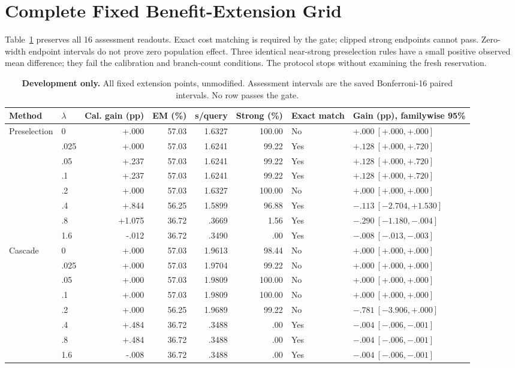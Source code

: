 \documentclass[11pt]{article}
\begin{document}
\section{Complete Fixed Benefit-Extension Grid}
\label{app:benefit}
Table~\ref{tab:benefitall} preserves all 16 assessment readouts. Exact cost matching is required by the gate; clipped strong endpoints cannot pass. Zero-width endpoint intervals do not prove zero population effect. Three identical near-strong preselection rules have a small positive observed mean difference; they fail the calibration and branch-count conditions. The protocol stops without examining the fresh reservation.

\begin{table}[t]
\centering\small
\begin{tabular}{llrrrrll}
\toprule
Method & $\lambda$ & Cal. gain (pp) & EM (\%) & s/query & Strong (\%) & Exact match & Gain (pp), familywise 95\% \\
\midrule
Preselection & 0 & +.000 & 57.03 & 1.6327 & 100.00 & No & $+.000\ [+.000,+.000]$ \\
 & .025 & +.000 & 57.03 & 1.6241 & 99.22 & Yes & $+.128\ [+.000,+.720]$ \\
 & .05 & +.237 & 57.03 & 1.6241 & 99.22 & Yes & $+.128\ [+.000,+.720]$ \\
 & .1 & +.237 & 57.03 & 1.6241 & 99.22 & Yes & $+.128\ [+.000,+.720]$ \\
 & .2 & +.000 & 57.03 & 1.6327 & 100.00 & No & $+.000\ [+.000,+.000]$ \\
 & .4 & +.844 & 56.25 & 1.5899 & 96.88 & Yes & $-.113\ [-2.704,+1.530]$ \\
 & .8 & +1.075 & 36.72 & .3669 & 1.56 & Yes & $-.290\ [-1.180,-.004]$ \\
 & 1.6 & -.012 & 36.72 & .3490 & .00 & Yes & $-.008\ [-.013,-.003]$ \\
\midrule
Cascade & 0 & +.000 & 57.03 & 1.9613 & 98.44 & No & $+.000\ [+.000,+.000]$ \\
 & .025 & +.000 & 57.03 & 1.9704 & 99.22 & No & $+.000\ [+.000,+.000]$ \\
 & .05 & +.000 & 57.03 & 1.9809 & 100.00 & No & $+.000\ [+.000,+.000]$ \\
 & .1 & +.000 & 57.03 & 1.9809 & 100.00 & No & $+.000\ [+.000,+.000]$ \\
 & .2 & +.000 & 56.25 & 1.9689 & 99.22 & No & $-.781\ [-3.906,+.000]$ \\
 & .4 & +.484 & 36.72 & .3488 & .00 & Yes & $-.004\ [-.006,-.001]$ \\
 & .8 & +.484 & 36.72 & .3488 & .00 & Yes & $-.004\ [-.006,-.001]$ \\
 & 1.6 & -.008 & 36.72 & .3488 & .00 & Yes & $-.004\ [-.006,-.001]$ \\
\bottomrule
\end{tabular}
\caption{\textbf{Development only.} All fixed extension points, unmodified. Assessment intervals are the saved Bonferroni-16 paired intervals. No row passes the gate.}
\label{tab:benefitall}
\end{table}
\end{document}
